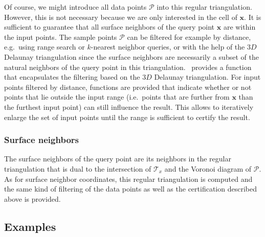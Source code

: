 Of course, we might introduce all data points $\mathcal{P}$ into 
this regular triangulation. However, this is not necessary because we are only interested in the cell of $\mathbf{x}$. It is sufficient to  
guarantee that all
surface neighbors of the query point $\mathbf{x}$ are within the 
input points. The
sample points $\mathcal{P}$ can be filtered for example by distance,
e.g.\ using range search or $k$-nearest neighbor queries, or with the
help of the $3D$ Delaunay triangulation since the surface neighbors
are necessarily a subset of the natural neighbors of the query point
in this triangulation. \cgal\ provides a function that encapsulates
the filtering based on the $3D$ Delaunay triangulation. For input
points filtered by distance, functions are provided that indicate
whether or not points that lie outside the input range (i.e.\ points
that are further from $\mathbf{x}$ than the furthest input point)
can still influence the result.  This allows to iteratively enlarge
the set of input points until the range is sufficient to certify the
result.

\subsubsection{Surface neighbors}

The surface neighbors of the query point are its neighbors in the
regular triangulation that is dual to the intersection of
$\mathcal{T}_x$ and the Voronoi diagram of $\mathcal{P}$. As for
surface neighbor coordinates, this regular triangulation is computed
and the same kind of filtering of the data points as well as the
certification described above is provided.


\subsection{Examples}

